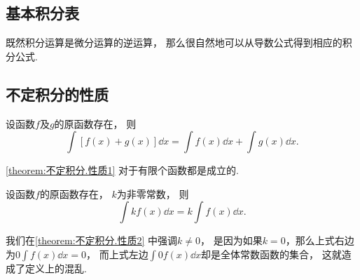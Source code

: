\subsection{基本积分表}
既然积分运算是微分运算的逆运算，
那么很自然地可以从导数公式得到相应的积分公式.

\subsection{不定积分的性质}
\begin{property}\label{theorem:不定积分.性质1}
设函数\(f\)及\(g\)的原函数存在，
则\begin{equation*}
	\int [f(x) + g(x)] \dd{x}
	= \int f(x) \dd{x}
	+ \int g(x) \dd{x}.
\end{equation*}
\end{property}
\begin{remark}
\cref{theorem:不定积分.性质1} 对于有限个函数都是成立的.
\end{remark}

\begin{property}\label{theorem:不定积分.性质2}
设函数\(f\)的原函数存在，
\(k\)为非零常数，
则\begin{equation*}
	\int k f(x) \dd{x} = k \int f(x) \dd{x}.
\end{equation*}
\end{property}
\begin{remark}
我们在\cref{theorem:不定积分.性质2} 中强调\(k\neq0\)，
是因为如果\(k=0\)，那么上式右边为\(0 \int f(x) \dd{x} = 0\)，
而上式左边\(\int 0 f(x) \dd{x}\)却是全体常数函数的集合，
这就造成了定义上的混乱.
\end{remark}

